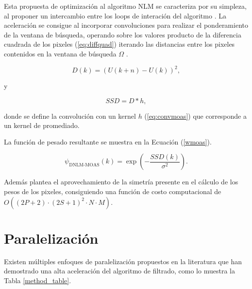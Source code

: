 Esta propuesta de optimizaci\'on al algoritmo NLM se caracteriza por su simpleza, al proponer un intercambio entre los loops de interaci\'on del algoritmo \cite{Condat2010}. La aceleraci\'on se consigue al incorporar convoluciones para realizar el ponderamiento de la ventana de b\'usqueda, operando sobre los valores producto de la diferencia cuadrada de los pixeles (\ref{eq:diffquad}) iterando las distancias entre los pixeles contenidos en la ventana de b\'usqueda $\Omega$ \cite{Condat2010}. 

\begin{equation}
D\left(k\right) = \left(U\left(k + n\right) - U\left( k \right)\right)^2 ,
\label{eq:diffquad}
\end{equation}

y 

\begin{equation}
\label{eq:convmoas}
SSD = D * h ,
\end{equation}

donde se define la convoluci\'on con un kernel $h$ (\ref{eq:convmoas}) que corresponde a un kernel de promediado.


La funci\'on de pesado resultante se muestra en la Ecuaci\'on (\ref{wmoas}). 

\begin{equation}

\psi_{\textrm{DNLM-MOAS}}\left(k\right)=\exp\left(-\frac{ SSD\left(k\right) }{\sigma^{2}}\right).
\label{eq:wmoas}
\end{equation}


Adem\'as plantea el aprovechamiento de la simetr\'ia presente en el c\'alculo de los pesos de los pixeles, consiguiendo una funci\'on de costo computacional de $O((2P + 2) \cdot (2S + 1)^2 \cdot N \cdot M)$.  





\section{Paralelizaci\'on}
\label{ch:marco_parallel}

Existen m\'ultiples enfoques de paralelizaci\'on propuestos en la literatura que han demostrado una alta aceleraci\'on del algoritmo de filtrado, como lo muestra la Tabla \ref{method_table}. 


